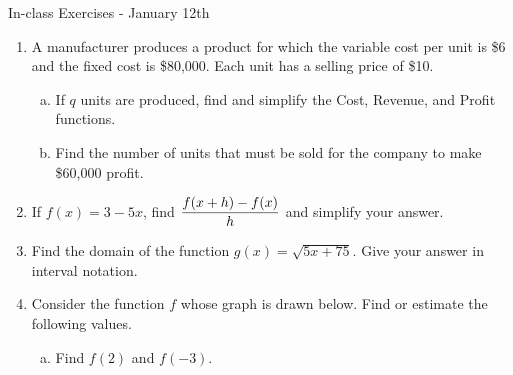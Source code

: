 \documentclass[11pt,fleqn,dvipsnames,usenames]{article}
\renewcommand{\headrulewidth}{1pt}
\begin{document}
\fancyhead[R]{\term}
\renewcommand{\headrulewidth}{0.4pt}

\begin{center}
\Large{In-class Exercises - January 12th}
\end{center}

\begin{enumerate}
\item  A manufacturer produces a product for which the variable cost per unit is \$6 and the
fixed cost is \$80,000. Each unit has a selling price of \$10. 
\begin{enumerate}[(a)]
\item If $q$ units are produced, find and simplify the Cost, Revenue, and Profit functions.
\item Find the number of units that must be sold for the company to make \$60,000 profit.
\end{enumerate}
\item If $f(x)=3 - 5x$, find $\displaystyle{\frac{f(x+h)-f(x)}{h}}$ and simplify your answer.
\item Find the domain of the function $g(x)=\sqrt{5x+75}$.  Give your answer in interval notation.
\item Consider the function $f$ whose graph is drawn below.  Find or estimate the following values.
\begin{multicols}{2}
\begin{center}
\end{center}
\begin{enumerate}[(a)]
\item Find $f(2)$ and $f(-3)$.


\end{enumerate}
\end{multicols}
\end{enumerate}
\end{document}
